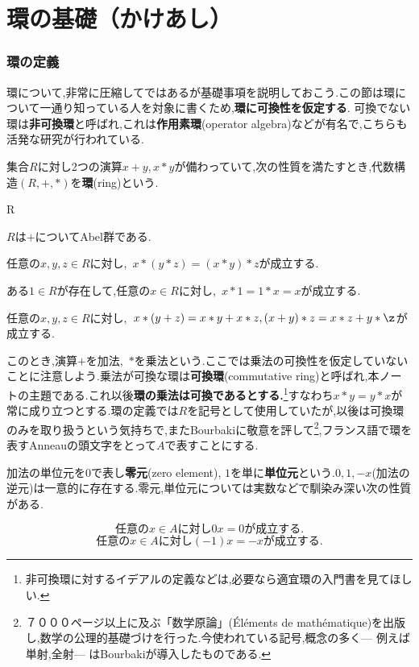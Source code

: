 \setcounter{part}{-1}
\part[Definition of Ring and more...]{環の基礎（かけあし）}
\section{環の定義}

環について,非常に圧縮してではあるが基礎事項を説明しておこう.この節は環について一通り知っている人を対象に書くため,\textbf{環に可換性を仮定する}. 可換でない環は\textbf{非可換環}と呼ばれ,これは\textbf{作用素環}(operator algebra)などが有名で,こちらも活発な研究が行われている.
\begin{defi}[環]
	集合$R$に対し2つの演算$x+y,x*y$が備わっていて,次の性質を満たすとき,代数構造$(R,+,*)$を\textbf{環}(ring)という.
	\begin{defiterm}{R}
		\item $R$は$+$についてAbel群である.
		\item 任意の$x,y,z\in R$に対し,~$x*(y*z)=(x*y)*z$が成立する.
		\item ある$1\in R$が存在して,任意の$x\in R$に対し,~$x*1=1*x=x$が成立する.
		\item 任意の$x,y,z\in R$に対し,~$x*(y+z)=x*y+x*z,(x+y)*z=x*z+y*\z$が成立する.
	\end{defiterm}
\end{defi}

このとき,演算$+$を加法,~$*$を乗法という.ここでは乗法の可換性を仮定していないことに注意しよう.乗法が可換な環は\textbf{可換環}(commutative ring)と呼ばれ,本ノートの主題である.これ以後\textbf{環の乗法は可換であるとする.}\footnote{非可換環に対するイデアルの定義などは,必要なら適宜環の入門書を見てほしい.}すなわち$x*y=y*x$が常に成り立つとする.環の定義では$R$を記号として使用していたが,以後は可換環のみを取り扱うという気持ちで,またBourbakiに敬意を評して\footnote{７０００ページ以上に及ぶ「数学原論」(Él\'ements de math\'ematique)を出版し,数学の公理的基礎づけを行った.今使われている記号,概念の多く--- 例えば単射,全射--- はBourbakiが導入したものである.},フランス語で環を表すAnneauの頭文字をとって$A$で表すことにする.

加法の単位元を$0$で表し\textbf{零元}(zero element), $1$を単に\textbf{単位元}という.$0,1,-x$(加法の逆元)は一意的に存在する.零元,単位元については実数などで馴染み深い次の性質がある.

\[\text{任意の}x\in A\text{に対し}0x=0\text{が成立する.}\]
\[\text{任意の}x\in A\text{に対し}(-1)x=-x\text{が成立する.}\]

